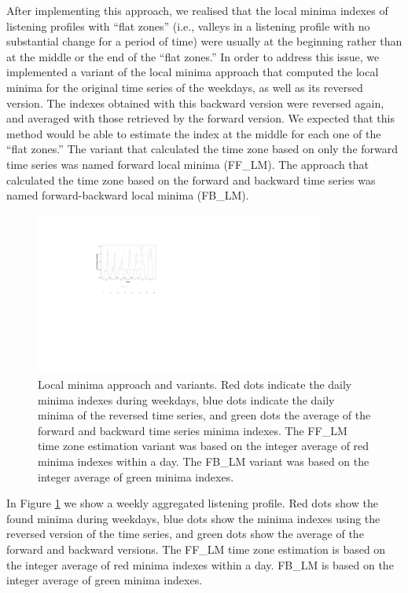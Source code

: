 After implementing this approach, we realised that the local minima indexes of listening profiles with ``flat zones'' (i.e., valleys in a listening profile with no substantial change for a period of time) were usually at the beginning rather than at the middle or the end of the ``flat zones.'' 
In order to address this issue, we implemented a variant of the local minima approach that computed the local minima for the original time series of the weekdays, as well as its reversed version. The indexes obtained with this backward version were reversed again, and averaged with those retrieved by the forward version.
We expected that this method would be able to estimate the index at the middle for each one of the ``flat zones.'' 
The variant that calculated the time zone based on only the forward time series was named forward local minima (FF\_LM). The approach that calculated the time zone based on the forward and backward time series was named forward-backward local minima (FB\_LM).

\begin{figure}[!h]
\centering
\includegraphics[width = 0.85\textwidth]{local_minima_C.pdf}
\caption[Time-zone normalisation, local minima approach and variants]{Local minima approach and variants. Red dots indicate the daily minima indexes during weekdays, blue dots indicate the daily minima of the reversed time series, and green dots the average of the forward and backward time series minima indexes. The FF\_LM time zone estimation variant was based on the integer average of red minima indexes within a day. The FB\_LM variant was based on the integer average of green minima indexes.}
\label{fig:local_minima}
\end{figure}


In Figure \ref{fig:local_minima} we show a weekly aggregated listening profile. Red dots show the found minima during weekdays, blue dots show the minima indexes using the reversed version of the time series, and green dots show the average of the forward and backward versions. The FF\_LM time zone estimation is based on the integer average of red minima indexes within a day. FB\_LM is based on the integer average of green minima indexes.



